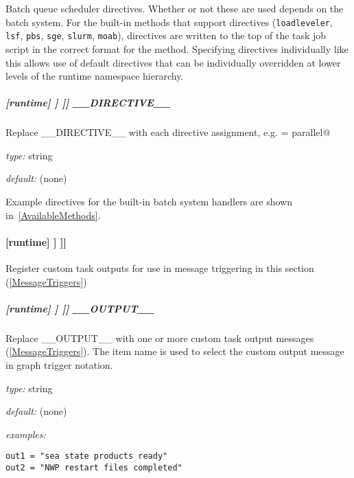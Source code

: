 Batch queue scheduler directives.  Whether or not these are used depends
on the batch system. For the built-in methods that support directives
(\lstinline=loadleveler=, \lstinline=lsf=, \lstinline=pbs=, \lstinline=sge=,
\lstinline=slurm=, \lstinline=moab=), directives are written to the top of the
task job script in the correct format for the method. Specifying directives
individually like this allows use of default directives that can be
individually overridden at lower levels of the runtime namespace hierarchy.

\subparagraph[\_\_DIRECTIVE\_\_ ]{[runtime] \textrightarrow [[\_\_NAME\_\_]] \textrightarrow [[[directives]]] \textrightarrow \_\_DIRECTIVE\_\_}

Replace \_\_DIRECTIVE\_\_ with each directive assignment, e.g.
\lstinline@class = parallel@

\begin{myitemize}
\item {\em type:} string
\item {\em default:} (none)
\end{myitemize}

Example directives for the built-in batch system handlers are shown
in~\ref{AvailableMethods}.

\paragraph[{[[[}outputs{]]]}]{[runtime] \textrightarrow [[\_\_NAME\_\_]] \textrightarrow [[[outputs]]]}

Register custom task outputs for use in message triggering in this section
(\ref{MessageTriggers})

\subparagraph[\_\_OUTPUT\_\_ ]{[runtime] \textrightarrow [[\_\_NAME\_\_]] \textrightarrow [[[outputs]]] \textrightarrow \_\_OUTPUT\_\_}

Replace \_\_OUTPUT\_\_ with one or more custom task output messages
(\ref{MessageTriggers}).  The item name is used to select the custom output
message in graph trigger notation.
\begin{myitemize}
    \item {\em type:} string
    \item {\em default:} (none)
    \item{ \em examples:}
\end{myitemize}
\begin{lstlisting}
out1 = "sea state products ready"
out2 = "NWP restart files completed"
\end{lstlisting}

